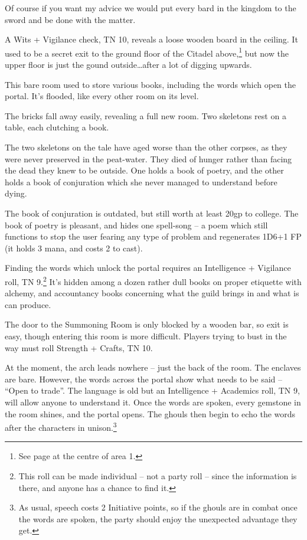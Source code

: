 \begin{multicols}{2}
\begin{exampletext}
	Of course if you want my advice we would put every bard in the kingdom to the sword and be done with the matter.

\end{exampletext}

A Wits + Vigilance check, TN 10, reveals a loose wooden board in the ceiling.
It used to be a secret exit to the ground floor of the Citadel above,\footnote{See page \pageref{lost_citadel} at the centre of area 1.} but now the upper floor is just the gound outside\ldots after a lot of digging upwards.


This bare room used to store various books, including the words which open the portal.  It's flooded, like every other room on its level.

\begin{boxtext}

	The bricks fall away easily, revealing a full new room.  Two skeletons rest on a table, each clutching a book.

\end{boxtext}

The two skeletons on the tale have aged worse than the other corpses, as they were never preserved in the peat-water.  They died of hunger rather than facing the dead they knew to be outside.  One holds a book of poetry, and the other holds a book of conjuration which she never managed to understand before dying.

The book of conjuration is outdated, but still worth at least 20gp to \gls{college}.  The book of poetry is pleasant, and hides one spell-song -- a poem which still functions to stop the user fearing any type of problem and regenerates 1D6+1 FP (it holds 3 mana, and costs 2 to cast).

Finding the words which unlock the portal requires an Intelligence + Vigilance roll, TN 9.\footnote{This roll can be made individual -- not a party roll -- since the information is there, and anyone has a chance to find it.}
It's hidden among a dozen rather dull books on proper etiquette with alchemy, and accountancy books concerning what the guild brings in and what is can produce.

The door to the Summoning Room is only blocked by a wooden bar, so exit is easy, though entering this room is more difficult.
Players trying to bust in the way must roll Strength + Crafts, TN 10.


At the moment, the arch leads nowhere  -- just the back of the room.  The enclaves are bare.
However, the words across the portal show what needs to be said -- ``Open to trade''.
The language is old but an Intelligence + Academics roll, TN 9, will allow anyone to understand it.
Once the words are spoken, every gemstone in the room shines, and the portal opens.
The ghouls then begin to echo the words after the characters in unison.\footnote{As usual, speech costs 2 Initiative points, so if the ghouls are in combat once the words are spoken, the party should enjoy the unexpected advantage they get.}


\end{multicols}
